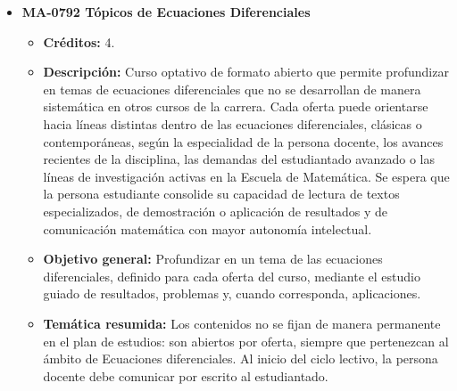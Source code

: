 \begin{itemize}[leftmargin=1.3em, itemsep=10pt, topsep=4pt, label={\color{Azul-UCR}$\blacksquare$}]
\item {\color{Azul-UCR}\textbf{MA-0792 Tópicos de Ecuaciones Diferenciales}}\par\nopagebreak\smallskip
\begin{itemize}[leftmargin=1.1em, itemsep=3pt, topsep=2pt, parsep=2pt, label={\textendash}]
\item \textbf{Créditos:} 4.
\item \textbf{Descripción:} Curso optativo de formato abierto que permite profundizar en temas de ecuaciones diferenciales que no se desarrollan de manera sistemática en otros cursos de la carrera. Cada oferta puede orientarse hacia líneas distintas dentro de las ecuaciones diferenciales, clásicas o contemporáneas, según la especialidad de la persona docente, los avances recientes de la disciplina, las demandas del estudiantado avanzado o las líneas de investigación activas en la Escuela de Matemática. Se espera que la persona estudiante consolide su capacidad de lectura de textos especializados, de demostración o aplicación de resultados y de comunicación matemática con mayor autonomía intelectual.
\item \textbf{Objetivo general:} Profundizar en un tema de las ecuaciones diferenciales, definido para cada oferta del curso, mediante el estudio guiado de resultados, problemas y, cuando corresponda, aplicaciones.
\item \textbf{Temática resumida:} Los contenidos no se fijan de manera permanente en el plan de estudios: son abiertos por oferta, siempre que pertenezcan al ámbito de Ecuaciones diferenciales. Al inicio del ciclo lectivo, la persona docente debe comunicar por escrito al estudiantado.
\end{itemize}


\end{itemize}

